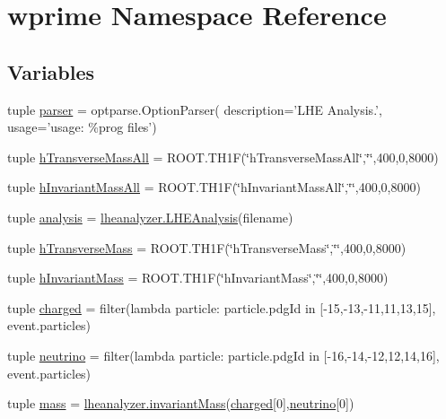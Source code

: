 \section{wprime Namespace Reference}
\label{namespacewprime}
\subsection*{Variables}
\begin{DoxyCompactItemize}
\item 
tuple \hyperlink{namespacewprime_a63569f7a72dfda59eb510ce76651466c}{parser} = optparse.\-Option\-Parser( description='L\-H\-E Analysis.', usage='usage\-: \%prog files')
\item 
tuple \hyperlink{namespacewprime_ab19f1148d5fadc7f1b06601d37f3bd98}{h\-Transverse\-Mass\-All} = R\-O\-O\-T.\-T\-H1\-F(\char`\"{}h\-Transverse\-Mass\-All\char`\"{},\char`\"{}\char`\"{},400,0,8000)
\item 
tuple \hyperlink{namespacewprime_ad2dfae94ced65369bf5bcd8262a32357}{h\-Invariant\-Mass\-All} = R\-O\-O\-T.\-T\-H1\-F(\char`\"{}h\-Invariant\-Mass\-All\char`\"{},\char`\"{}\char`\"{},400,0,8000)
\item 
tuple \hyperlink{namespacewprime_aaa589daa7007d01a1a492b22539b19c6}{analysis} = \hyperlink{classlheanalyzer_1_1LHEAnalysis}{lheanalyzer.\-L\-H\-E\-Analysis}(filename)
\item 
tuple \hyperlink{namespacewprime_a7b192ad124dcdea0625bb9b0c55c6477}{h\-Transverse\-Mass} = R\-O\-O\-T.\-T\-H1\-F(\char`\"{}h\-Transverse\-Mass\char`\"{},\char`\"{}\char`\"{},400,0,8000)
\item 
tuple \hyperlink{namespacewprime_a27c3f5d5e385cb00150833fedb9001c0}{h\-Invariant\-Mass} = R\-O\-O\-T.\-T\-H1\-F(\char`\"{}h\-Invariant\-Mass\char`\"{},\char`\"{}\char`\"{},400,0,8000)
\item 
tuple \hyperlink{namespacewprime_af629c79a2061f7dcdee447ba6ebe2a7d}{charged} = filter(lambda particle\-: particle.\-pdg\-Id in \mbox{[}-\/15,-\/13,-\/11,11,13,15\mbox{]}, event.\-particles)
\item 
tuple \hyperlink{namespacewprime_aa30022404f607643027f776a815f22e8}{neutrino} = filter(lambda particle\-: particle.\-pdg\-Id in \mbox{[}-\/16,-\/14,-\/12,12,14,16\mbox{]}, event.\-particles)
\item 
tuple \hyperlink{namespacewprime_ad374268a3fa087dcdcb8aa73f71685b6}{mass} = \hyperlink{namespacelheanalyzer_ac56286ded5530897c81cc13b79edfd59}{lheanalyzer.\-invariant\-Mass}(\hyperlink{namespacewprime_af629c79a2061f7dcdee447ba6ebe2a7d}{charged}\mbox{[}0\mbox{]},\hyperlink{namespacewprime_aa30022404f607643027f776a815f22e8}{neutrino}\mbox{[}0\mbox{]})

\end{DoxyCompactItemize}

